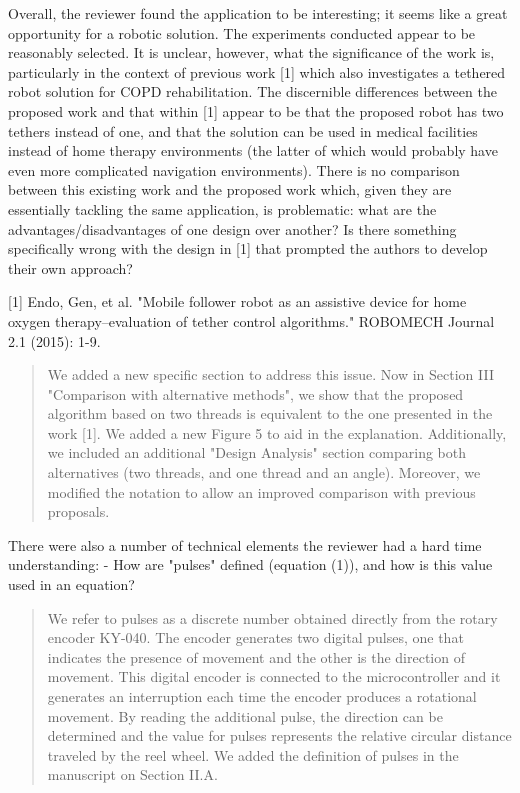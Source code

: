 \documentclass[journal,onecolumn,12pt]{IEEEtran}
\begin{document}
Overall, the reviewer found the application to be interesting; it seems like a great opportunity for a robotic solution. The experiments conducted appear to be reasonably selected. It is unclear, however, what the significance of the work is, particularly in the context of previous work [1] which also investigates a tethered robot solution for COPD rehabilitation. The discernible differences between the proposed work and that within [1] appear to be that the proposed robot has two tethers instead of one, and that the solution can be used in medical facilities instead of home therapy environments (the latter of which would probably have even more complicated navigation environments). There is no comparison between this existing work and the proposed work which, given they are essentially tackling the same application, is problematic: what are the advantages/disadvantages of one design over another? Is there something specifically wrong with the design in [1] that prompted the authors to develop their own approach?

\vspace{2em}

[1]  Endo, Gen, et al. "Mobile follower robot as an assistive device for home oxygen therapy–evaluation of tether control algorithms." ROBOMECH Journal 2.1 (2015): 1-9.

\begin{quotation}
{\color{blue}
We added a new specific section to address this issue.  Now in Section III "Comparison with alternative methods", we show that the proposed algorithm based on two threads is equivalent to the one presented in the work [1].  We added a new Figure 5 to aid in the explanation.  Additionally, we included an additional "Design Analysis" section comparing both alternatives (two threads, and one thread and an angle).  Moreover, we modified the notation to allow an improved comparison with previous proposals.
}
\end{quotation}

There were also a number of technical elements the reviewer had a hard time understanding:
- How are "pulses" defined (equation (1)), and how is this value used in an equation?

\begin{quotation}
{\color{blue}
We refer to pulses as a discrete number obtained directly from the rotary encoder KY-040.  The encoder generates two digital pulses, one that indicates the presence of movement and the other is the direction of movement.  This digital encoder is connected to the microcontroller and it generates an interruption each time the encoder produces a rotational movement.  By reading the additional pulse, the direction can be determined and the value for pulses represents the relative circular distance traveled by the reel wheel.   We added the definition of pulses in the manuscript on Section II.A.
}
\end{quotation}
\end{document}
